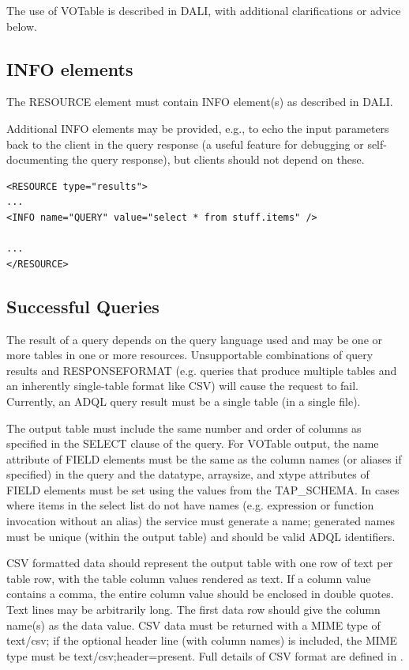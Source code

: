 \documentclass[11pt,letter]{ivoa}
\newcommand{\tapschema}{TAP\_SCHE\-MA}
\newcommand{\tapschema}{\mbox{%
  \relsize{-0.5}TAP\discretionary{-}{}{\kern-2pt\_}SCHEMA}}
\begin{document}
The use of VOTable is described in DALI, with additional clarifications
or advice below.

\subsection{INFO elements}
\label{sec:vot-info}

The RESOURCE element must contain INFO element(s) as described in DALI.

Additional INFO elements may be provided, e.g., to echo the input parameters 
back to the client in the query response (a useful feature for debugging or  
self-documenting the query response), but clients should not depend on these. 

\begin{verbatim}
<RESOURCE type="results">
...
<INFO name="QUERY" value="select * from stuff.items" />

...
</RESOURCE>
\end{verbatim}

\subsection{Successful Queries}
\label{sec:query-ok}

The result of a query depends on the query language used and may be one or more 
tables in one or more resources. Unsupportable combinations of query results and 
RESPONSEFORMAT (e.g. queries that produce multiple tables and an inherently 
single-table format like CSV) will cause the request to fail. Currently, an ADQL 
query result must be a single table (in a single file).

The output table must include the same number and order of columns as specified 
in the SELECT clause of the query. For VOTable output, the name attribute of 
FIELD elements must be the same as the column names (or aliases if specified)  
in the query and the datatype, arraysize, and xtype 
attributes of FIELD elements must be set using the values from the \tapschema. 
In cases where items in the select list do not 
have names (e.g. expression or function invocation without an alias) the service 
must generate a name; 
generated names must be unique (within the output table) and should be valid 
ADQL identifiers.

CSV formatted data should represent the output table with one row of text per 
table row, with the table column values rendered as text. 
If a column value contains a comma, the entire column value should be 
enclosed in double quotes.  Text lines may be arbitrarily long.  The first data 
row should give the column name(s) as the data value.   CSV data must be returned 
with a MIME type of text/csv; if the optional header line (with column names) 
is included, the MIME type must be text/csv;header=present. Full details of CSV 
format are defined in \citet{std:CSV}.
\end{document}
